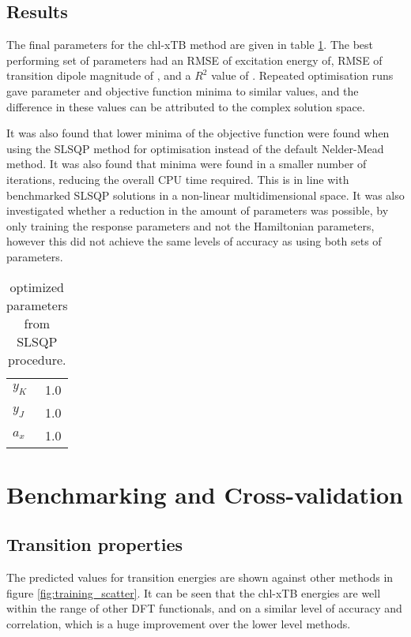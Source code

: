 \afterpartskip

\subsection{Results}
\label{subsec:chl_opt_results}

The final parameters for the chl-xTB method are given in table \ref{table:chl_params}.
The best performing set of parameters had an RMSE of excitation energy of, RMSE
of transition dipole magnitude of , and a $R^2$ value of . Repeated optimisation runs
gave parameter and objective function minima to similar values, and the difference in
these values can be attributed to the complex solution space.

It was also found that lower minima of the objective function were found when using
the SLSQP method for optimisation instead of the default Nelder-Mead method. It 
was also found that minima were found in a smaller number of iterations, reducing
the overall CPU time required. This is in line with benchmarked SLSQP solutions 
in a non-linear multidimensional space.
It was also investigated whether a reduction in the amount of parameters was possible,
by only training the response parameters and not the Hamiltonian parameters, however 
this did not achieve the same levels of accuracy as using both sets of parameters.

\begin{table}
    \centering
    \begin{tabular}{l | r}
        \hline
        $y_K$ & 1.0 \\
        $y_J$ & 1.0 \\
        $a_x$ & 1.0 \\
        \hline
    \end{tabular}
    \caption{optimized parameters from SLSQP procedure.}
    \label{table:chl_params}
\end{table}
    
\section{Benchmarking and Cross-validation}
\label{sec:chl_benchmarking}

\subsection{Transition properties}
\label{subsec:transition_properties}

The predicted values for \Qy transition energies are shown against other methods
in figure \ref{fig:training_scatter}. It can be seen that the chl-xTB energies are
well within the range of other DFT functionals, and on a similar level of accuracy
and correlation, which is a huge improvement over the lower level methods.


